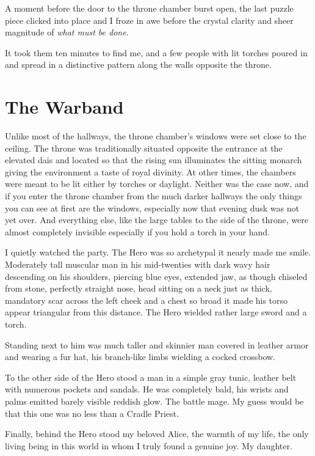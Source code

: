 A moment before the door to the throne chamber burst open, the last puzzle piece clicked into place and I froze in awe before the crystal clarity and sheer magnitude of \textit{what must be done}.

It took them ten minutes to find me, and a few people with lit torches poured in and spread in a distinctive pattern along the walls opposite the throne.

\section{The Warband}

Unlike most of the hallways, the throne chamber’s windows were set close to the ceiling. The throne was traditionally situated opposite the entrance at the elevated dais and located so that the rising sun illuminates the sitting monarch giving the environment a taste of royal divinity. At other times, the chambers were meant to be lit either by torches or daylight. Neither was the case now, and if you enter the throne chamber from the much darker hallways the only things you can see at first are the windows, especially now that evening dusk was not yet over. And everything else, like the large tables to the side of the throne, were almost completely invisible especially if you hold a torch in your hand.

I quietly watched the party. The Hero was so archetypal it nearly made me smile. Moderately tall muscular man in his mid-twenties with dark wavy hair descending on his shoulders, piercing blue eyes, extended jaw, as though chiseled from stone, perfectly straight nose, head sitting on a neck just as thick, mandatory scar across the left cheek and a chest so broad it made his torso appear triangular from this distance. The Hero wielded rather large sword and a torch.

Standing next to him was much taller and skinnier man covered in leather armor and wearing a fur hat, his branch-like limbs wielding a cocked crossbow.

To the other side of the Hero stood a man in a simple gray tunic, leather belt with numerous pockets and sandals. He was completely bald, his wrists and palms emitted barely visible reddish glow. The battle mage. My guess would be that this one was no less than a Cradle Priest.

Finally, behind the Hero stood my beloved Alice, the warmth of my life, the only living being in this world in whom I truly found a genuine joy. My daughter.


